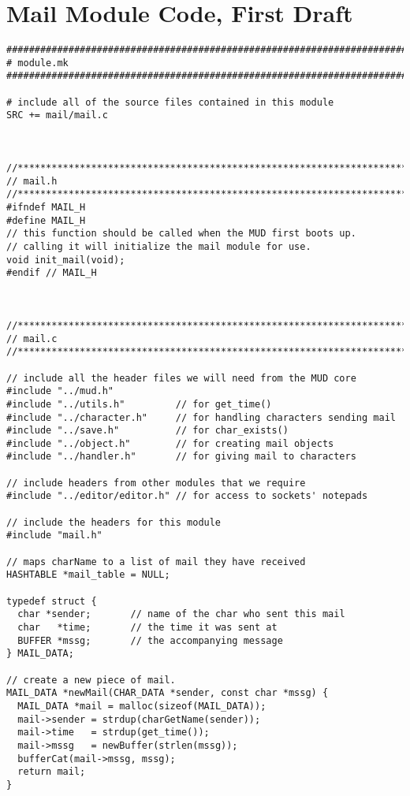 \documentclass[12pt]{article}
\begin{document}
\newpage \section{Mail Module Code, First Draft}
{\bf \begin{verbatim}
################################################################################
# module.mk
################################################################################

# include all of the source files contained in this module
SRC += mail/mail.c



//*****************************************************************************
// mail.h
//*****************************************************************************
#ifndef MAIL_H
#define MAIL_H
// this function should be called when the MUD first boots up.
// calling it will initialize the mail module for use.
void init_mail(void);
#endif // MAIL_H



//*****************************************************************************
// mail.c
//*****************************************************************************

// include all the header files we will need from the MUD core
#include "../mud.h"
#include "../utils.h"         // for get_time()
#include "../character.h"     // for handling characters sending mail
#include "../save.h"          // for char_exists()
#include "../object.h"        // for creating mail objects
#include "../handler.h"       // for giving mail to characters

// include headers from other modules that we require
#include "../editor/editor.h" // for access to sockets' notepads

// include the headers for this module
#include "mail.h"

// maps charName to a list of mail they have received
HASHTABLE *mail_table = NULL;

typedef struct {
  char *sender;       // name of the char who sent this mail
  char   *time;       // the time it was sent at
  BUFFER *mssg;       // the accompanying message
} MAIL_DATA;

// create a new piece of mail.
MAIL_DATA *newMail(CHAR_DATA *sender, const char *mssg) {
  MAIL_DATA *mail = malloc(sizeof(MAIL_DATA));
  mail->sender = strdup(charGetName(sender));
  mail->time   = strdup(get_time());
  mail->mssg   = newBuffer(strlen(mssg));
  bufferCat(mail->mssg, mssg);
  return mail;
}


\end{verbatim}}
\end{document}
